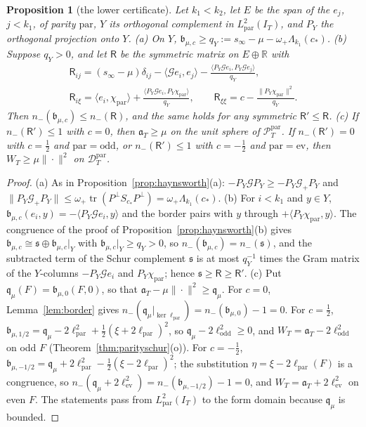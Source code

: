 \documentclass[11pt]{amsart}
\newtheorem{proposition}[theorem]{Proposition}
\theoremstyle{definition}
\theoremstyle{remark}
\newcommand{\R}{\mathbb R}
\newcommand{\PT}{\mathcal P_T}
\newcommand{\IT}{I_T}
\begin{document}
\begin{proposition}[the lower certificate]\label{prop:lowercert}
Let $k_1<k_2$, let $E$ be the span of the $e_j$, $j<k_1$, of parity $\mathrm{par}$, $Y$ its orthogonal
complement in $L^2_{\mathrm{par}}(\IT)$, and $P_Y$ the orthogonal projection onto $Y$.
\emph{(a)} On $Y$, $\mathfrak b_{\mu,c}\ge q_Y:=s_\infty-\mu-\omega_+\Lambda_{k_1}(c_*)$.
\emph{(b)} Suppose $q_Y>0$, and let $\mathsf R$ be the symmetric matrix on $E\oplus\R$ with
\[
\begin{gathered}
\mathsf R_{ij}=(s_\infty-\mu)\delta_{ij}-\langle\mathcal Ge_i,e_j\rangle
-\frac{\langle P_Y\mathcal Ge_i,P_Y\mathcal Ge_j\rangle}{q_Y},\\
\mathsf R_{i\xi}=\langle e_i,\chi_{\mathrm{par}}\rangle+\frac{\langle P_Y\mathcal Ge_i,P_Y\chi_{\mathrm{par}}\rangle}{q_Y},\qquad
\mathsf R_{\xi\xi}=c-\frac{\|P_Y\chi_{\mathrm{par}}\|^2}{q_Y}.
\end{gathered}
\]
Then $n_-(\mathfrak b_{\mu,c})\le n_-(\mathsf R)$, and the same holds for any symmetric $\mathsf R'\le\mathsf R$.
\emph{(c)} If $n_-(\mathsf R')\le1$ with $c=0$, then $\mathfrak a_T\ge\mu$ on the unit sphere of
$\PT^{\mathrm{par}}$. If $n_-(\mathsf R')=0$ with $c=\frac12$ and $\mathrm{par}=\mathrm{odd}$, or $n_-(\mathsf R')\le1$ with
$c=-\frac12$ and $\mathrm{par}=\mathrm{ev}$, then $W_T\ge\mu\|\cdot\|^2$ on $\mathcal D^{\mathrm{par}}_T$.
\end{proposition}
\begin{proof}\sloppy
(a) As in Proposition~\ref{prop:haynsworth}(a): $-P_Y\mathcal GP_Y\ge-P_Y\mathcal G_+P_Y$ and
$\|P_Y\mathcal G_+P_Y\|\le\omega_+\operatorname{tr}(P^\perp S_{c_*}P^\perp)=\omega_+\Lambda_{k_1}(c_*)$.
(b) For $i<k_1$ and $y\in Y$, $\mathfrak b_{\mu,c}(e_i,y)=-\langle P_Y\mathcal Ge_i,y\rangle$ and the border pairs
with $y$ through $+\langle P_Y\chi_{\mathrm{par}},y\rangle$. The congruence of the proof of
Proposition~\ref{prop:haynsworth}(b) gives $\mathfrak b_{\mu,c}\cong\mathfrak s\oplus\mathfrak b_{\mu,c}|_Y$ with
$\mathfrak b_{\mu,c}|_Y\ge q_Y>0$, so $n_-(\mathfrak b_{\mu,c})=n_-(\mathfrak s)$, and the subtracted term of the Schur
complement $\mathfrak s$ is at most $q_Y^{-1}$ times the Gram matrix of the $Y$-columns
$-P_Y\mathcal Ge_i$ and $P_Y\chi_{\mathrm{par}}$; hence $\mathfrak s\ge\mathsf R\ge\mathsf R'$.
(c) Put $\mathfrak q_\mu(F)=\mathfrak b_{\mu,0}(F,0)$, so that $\mathfrak a_T-\mu\|\cdot\|^2\ge\mathfrak q_\mu$. For
$c=0$, Lemma~\ref{lem:border} gives $n_-(\mathfrak q_\mu|_{\ker\ell_{\mathrm{par}}})=n_-(\mathfrak b_{\mu,0})-1=0$. For
$c=\frac12$, $\mathfrak b_{\mu,1/2}=\mathfrak q_\mu-2\ell_{\mathrm{par}}^2+\frac12(\xi+2\ell_{\mathrm{par}})^2$, so
$\mathfrak q_\mu-2\ell_{\mathrm{odd}}^2\ge0$, and $W_T=\mathfrak a_T-2\ell_{\mathrm{odd}}^2$ on odd $F$
(Theorem~\ref{thm:parityschur}(o)). For $c=-\frac12$,
$\mathfrak b_{\mu,-1/2}=\mathfrak q_\mu+2\ell_{\mathrm{par}}^2-\frac12(\xi-2\ell_{\mathrm{par}})^2$; the substitution
$\eta=\xi-2\ell_{\mathrm{par}}(F)$ is a congruence, so
$n_-(\mathfrak q_\mu+2\ell_{\mathrm{ev}}^2)=n_-(\mathfrak b_{\mu,-1/2})-1=0$, and $W_T=\mathfrak a_T+2\ell_{\mathrm{ev}}^2$ on even
$F$. The statements pass from $L^2_{\mathrm{par}}(\IT)$ to the form domain because $\mathfrak q_\mu$ is bounded.
\end{proof}
\end{document}
